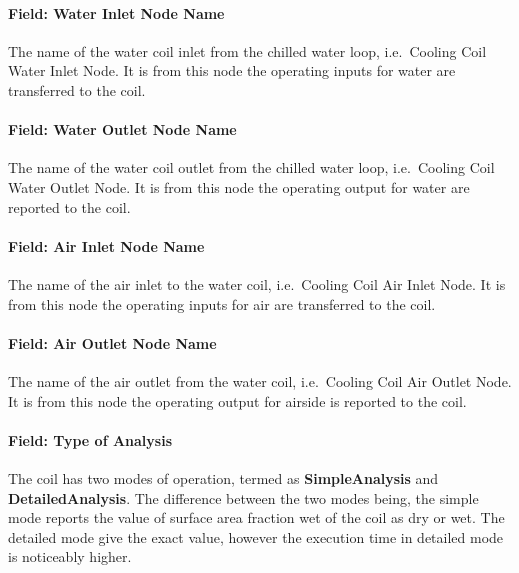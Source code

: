 \paragraph{Field: Water Inlet Node Name}\label{field-water-inlet-node-name-000}

The name of the water coil inlet from the chilled water loop, i.e.~Cooling Coil Water Inlet Node. It is from this node the operating inputs for water are transferred to the coil.

\paragraph{Field: Water Outlet Node Name}\label{field-water-outlet-node-name-000}

The name of the water coil outlet from the chilled water loop, i.e.~Cooling Coil Water Outlet Node. It is from this node the operating output for water are reported to the coil.

\paragraph{Field: Air Inlet Node Name}\label{field-air-inlet-node-name-003}

The name of the air inlet to the water coil, i.e.~Cooling Coil Air Inlet Node. It is from this node the operating inputs for air are transferred to the coil.

\paragraph{Field: Air Outlet Node Name}\label{field-air-outlet-node-name-003}

The name of the air outlet from the water coil, i.e.~Cooling Coil Air Outlet Node. It is from this node the operating output for airside is reported to the coil.

\paragraph{Field: Type of Analysis}\label{field-type-of-analysis}

The coil has two modes of operation, termed as \textbf{SimpleAnalysis} and \textbf{DetailedAnalysis}. The difference between the two modes being, the simple mode reports the value of surface area fraction wet of the coil as dry or wet. The detailed mode give the exact value, however the execution time in detailed mode is noticeably higher.

